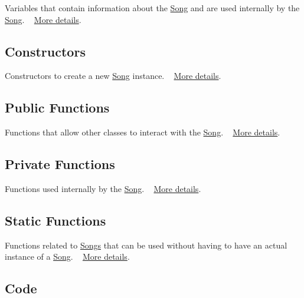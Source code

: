 $$Variables that contain information about the \hyperlink{class_song}{Song} and are used internally by the \hyperlink{class_song}{Song}. ~\newline
 \hyperlink{group___song_priv_var}{More details}.\hypertarget{group___doc_song_DocSongConstruct}{}\subsection{Constructors}\label{group___doc_song_DocSongConstruct}
Constructors to create a new \hyperlink{class_song}{Song} instance. ~\newline
 \hyperlink{group___song_construct}{More details}.\hypertarget{group___doc_song_DocSongPubFunc}{}\subsection{Public Functions}\label{group___doc_song_DocSongPubFunc}
Functions that allow other classes to interact with the \hyperlink{class_song}{Song}. ~\newline
 \hyperlink{group___song_pub_func}{More details}.\hypertarget{group___doc_song_DocSongPrivFunc}{}\subsection{Private Functions}\label{group___doc_song_DocSongPrivFunc}
Functions used internally by the \hyperlink{class_song}{Song}. ~\newline
 \hyperlink{group___song_priv_func}{More details}.\hypertarget{group___doc_song_DocSongStatFunc}{}\subsection{Static Functions}\label{group___doc_song_DocSongStatFunc}
Functions related to \hyperlink{class_song}{Songs} that can be used without having to have an actual instance of a \hyperlink{class_song}{Song}. ~\newline
 \hyperlink{group___song_stat_func}{More details}.\hypertarget{group___doc_song_DocSongCode}{}\subsection{Code}\label{group___doc_song_DocSongCode}

